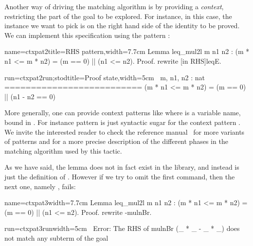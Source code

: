 Another way of driving the matching algorithm is by providing a
\emph{context}, restricting the part of the goal to be explored. For
instance, in this case, the instance we want to pick is on
the right hand side of the identity to be proved. We can implement
this specification using the pattern \C{[in RHS]}:

\begin{coq-left}{name=ctxpat2}{title=RHS pattern,width=7.7cm}
Lemma leq_mul2l m n1 n2 :
(m * n1 <= m * n2) =
  (m == 0) || (n1 <= n2).
Proof.
rewrite [in RHS]leqE.
\end{coq-left}
\begin{coqout-right}{run=ctxpat2run;stod}{title=Proof state,width=5cm}
$~$
m, n1, n2 : nat
==========================
(m * n1 <= m * n2) =
  (m == 0) || (n1 - n2 == 0)
\end{coqout-right}

More generally, one can provide context patterns like \C{[in X in T]}
where  is a variable name, bound in . For instance pattern
\C{[in RHS]} is just syntactic sugar for the context pattern
\C{[in X in _ = X]}.  We invite the interested reader to check the
reference manual~\cite[section 8]{ssrman} for more variants of patterns and for a
more precise description of the different phases in the matching
algorithm used by this tactic.

As we have said, the lemma  does not in fact exist in the
library, and instead is just the definition of . %
However if we
try to omit the first  command, then the next one,
namely , fails:

\begin{coq-left}{name=ctxpat3}{width=7.7cm}
Lemma leq_mul2l m n1 n2 :
(m * n1 <= m * n2) =
  (m == 0) || (n1 <= n2).
Proof.
rewrite -mulnBr.
\end{coq-left}
\begin{coqout-right}{run=ctxpat3run}{width=5cm}
$~$
Error: The RHS of mulnBr
  (_ * _ - _ * _)
does not match any subterm
of the goal
\end{coqout-right}

